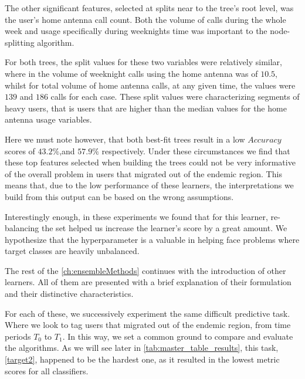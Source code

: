 The other significant features, selected at splits near to the tree's root level, was the user's home antenna call count.
Both the volume of calls during the whole week and usage specifically during weeknights time was important to the node-splitting algorithm.

For both trees, the split values for these two variables were relatively similar, where in the volume of weeknight calls using the home antenna was of $10.5$, whilst for total volume of home antenna calls, at any given time, the values were $139$ and $186$ calls for each case.
These split values were characterizing segments of heavy users, that is users that are higher than the median values for the home antenna usage variables.%



Here we must note however, that both best-fit trees result in a low $Accuracy$ scores of $43.2\%$,and $57.9\%$ respectively.
Under these circumstances we find that these top features selected when building the trees could not be very informative of the overall problem in users that migrated out of the endemic region.
This means that, due to the low performance of these learners, the interpretations we build from this output can be based on the wrong assumptions.



Interestingly enough, in these experiments we found that for this learner, re-balancing the set helped us increase the learner's score by a great amount.
We hypothesize that the hyperparameter is a valuable in helping face problems where target classes are heavily unbalanced.



The rest of the \cref{ch:ensembleMethods} continues with the introduction of other learners.
All of them are presented with a brief explanation of their formulation and their distinctive characteristics.

For each of these, we successively experiment the same difficult predictive task.
Where we look to tag users that migrated out of the endemic region, from time periods $T_0$ to $T_1$.
In this way, we set a common ground to compare and evaluate the algorithms.
As we will see later in \cref{tab:master_table_results}, this task, \cref{target2}, happened to be the hardest one, as it resulted in the lowest metric scores for all classifiers.

